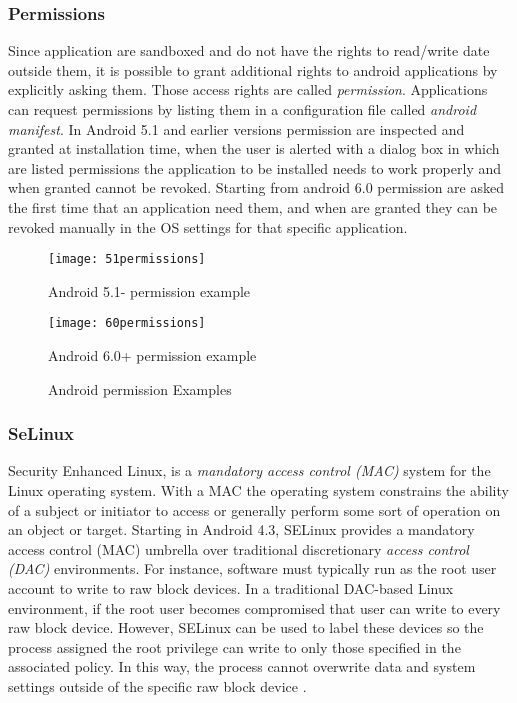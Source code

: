 	\subsubsection{Permissions} Since application are sandboxed and do not have the rights to read/write date outside them, it is possible to grant additional rights to android applications by explicitly asking them. Those access rights are called \textit{permission}. Applications can request permissions by listing them in a configuration file called \textit{android manifest}. In Android 5.1 and earlier versions permission are inspected and granted at installation time, when the user is alerted with a dialog box in which are listed permissions the application to be installed needs to work properly and when granted cannot be revoked. Starting from android 6.0 permission are asked the first time that an application need them, and when are granted they can be revoked manually in the OS settings for that specific application.
	
		\begin{figure}[h]
		\centering
		\begin{minipage}[c]{.45\textwidth}
			\centering\setlength{\captionmargin}{0pt}%
			\texttt{[image: 51permissions]}
			\caption{Android 5.1- permission example}
		\end{minipage}%
		\hspace{10mm}%
		\begin{minipage}[c]{.45\textwidth}
			\centering\setlength{\captionmargin}{0pt}%
			\texttt{[image: 60permissions]}
			\caption{Android 6.0+ permission example}
		\end{minipage}
		\caption{Android permission Examples\label{fig:Andorid permission Examples}}
	\end{figure}

	\subsubsection{SeLinux} Security Enhanced Linux, is a \textit{mandatory access control (MAC)} system for the Linux operating system. With a MAC the operating system constrains the ability of a subject or initiator to access or generally perform some sort of operation on an object or target. Starting in Android 4.3, SELinux provides a mandatory access control (MAC) umbrella over traditional discretionary \textit{access control (DAC)} environments. For instance, software must typically run as the root user account to write to raw block devices. In a traditional DAC-based Linux environment, if the root user becomes compromised that user can write to every raw block device. However, SELinux can be used to label these devices so the process assigned the root privilege can write to only those specified in the associated policy.
 	In this way, the process cannot overwrite data and system settings outside of the specific raw block device \cite{secure2017android}.

